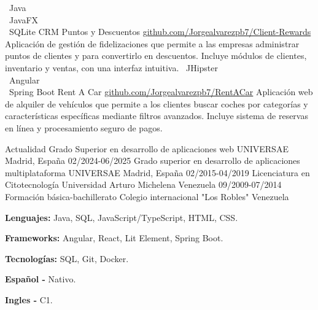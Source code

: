 \documentclass[9pt]{./src/developercv} %
\begin{document}
\begin{entrylist}
	\entry
	{ \textbullet\ Java \\ \textbullet\ JavaFX \\ \textbullet\ SQLite}
	{CRM Puntos y Descuentos}
	{\href {https://github.com/Jorgealvarezpb7/Client-Rewards}          {github.com/Jorgealvarezpb7/Client-Rewards}}
	{Aplicación de gestión de fidelizaciones que permite a las empresas administrar puntos de clientes y para convertirlo en descuentos. Incluye módulos de clientes, inventario y ventas, con una interfaz intuitiva.}
	\entry
	{ \textbullet\ JHipster \\ \textbullet\ Angular \\ \textbullet\ Spring Boot}
	{Rent A Car}
	{\href {https://github.com/Jorgealvarezpb7/RentACar}          {github.com/Jorgealvarezpb7/RentACar}}
	{Aplicación web de alquiler de vehículos que permite a los clientes buscar coches por categorías y características específicas mediante filtros avanzados. Incluye sistema de reservas en línea y procesamiento seguro de pagos.}
\end{entrylist}

\vspace{-10 pt}
\begin{entrylist}
	\entry
	{Actualidad}
	{Grado Superior en desarrollo de aplicaciones web}
	{UNIVERSAE}
	{Madrid, España}
	\entry
	{02/2024-06/2025}
	{Grado superior en desarrollo de aplicaciones multiplataforma}
	{UNIVERSAE}
	{Madrid, España}
	\entry
	{02/2015-04/2019}
	{Licenciatura en Citotecnología}
	{Universidad Arturo Michelena}
	{Venezuela}
	\entry
	{09/2009-07/2014}
	{Formación básica-bachillerato}
	{Colegio internacional "Los Robles"}
	{Venezuela}
\end{entrylist}

\vspace{-10 pt}
\begin{minipage}[t]{\textwidth}
\vspace{-6pt}

\begin{minipage}[t]{\textwidth}
		\textbf{Lenguajes:}
		Java, SQL, JavaScript/TypeScript, HTML, CSS.
	\end{minipage}
	\vspace{-1 pt}

	\begin{minipage}[t]{\textwidth}
		\textbf{Frameworks:}
		Angular, React, Lit Element, Spring Boot.
	\end{minipage}
	\vspace{-1 pt}

	\begin{minipage}[t]{\textwidth}
		\textbf{Tecnologías:}
		SQL, Git, Docker.
	\end{minipage}
\end{minipage}

\vspace{10 pt}
\begin{minipage}[t]{\textwidth}
	\vspace{-6pt}

	\begin{minipage}[t]{\textwidth}
		\textbf{Español - }
		Nativo.
	\end{minipage}
	\vspace{-1 pt}

	\begin{minipage}[t]{\textwidth}
		\textbf{Ingles - }
		C1.
	\end{minipage}
\end{minipage}
\end{document}
